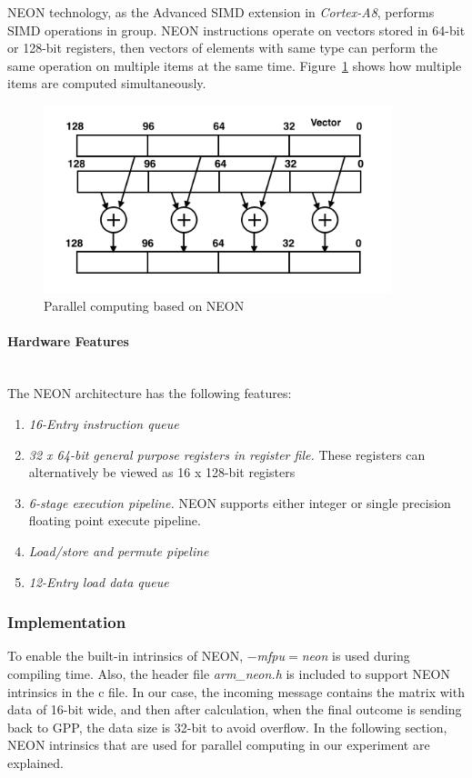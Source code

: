 NEON technology, as the Advanced SIMD extension in \emph{Cortex-A8}, performs SIMD operations in group. 
NEON instructions operate on vectors stored in 64-bit or 128-bit registers, 
then vectors of elements with same type can perform the same operation on multiple items at the same time.
Figure~\ref{fig:neon} shows how multiple items are computed simultaneously. 

\begin{figure}[h]
\centering
\includegraphics[width=0.9\textwidth]{images/neon}
\caption{Parallel computing based on NEON}
\label{fig:neon}
\end{figure}

\paragraph{Hardware Features}
~\\
The NEON architecture has the following features\cite{hardware}:
\begin{enumerate}
\item \emph{16-Entry instruction queue}
\item \emph{32 x 64-bit general purpose registers in register file.}
These registers can alternatively be viewed as 16 x 128-bit registers
\item \emph{6-stage execution pipeline.}
NEON supports either integer or single precision floating point execute pipeline.
\item \emph{Load/store and permute pipeline}
\item \emph{12-Entry load data queue}
\end{enumerate}

\subsubsection{Implementation}
To enable the built-in intrinsics of NEON, 
\emph{$-$mfpu$=$neon}\cite{ARMoptions} is used during compiling time.
Also, the header file \emph{arm\_neon.h} is included 
to support NEON intrinsics in the c file.
In our case, the incoming message contains the matrix with data of 16-bit wide, 
and then after calculation, when the final outcome is sending back to GPP, the data size is 32-bit to avoid overflow.
In the following section, NEON intrinsics that are used for parallel computing in our experiment are explained.

